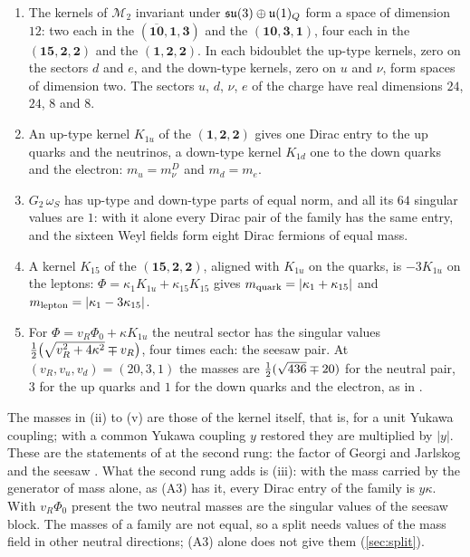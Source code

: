 \begin{theorem}
\label{thm:fermionmasses}
\begin{enumerate}[label=(\roman*),leftmargin=2.2em,itemsep=1pt]
\item The kernels of $\mathcal M_2$ invariant under $\mathfrak{su}(3)\oplus\mathfrak{u}(1)_Q$ form a space of dimension $12$: two each in the
$(\overline{\mathbf{10}},\mathbf1,\mathbf3)$ and the $(\mathbf{10},\mathbf3,\mathbf1)$, four each in the $(\mathbf{15},\mathbf2,\mathbf2)$ and the
$(\mathbf1,\mathbf2,\mathbf2)$. In each bidoublet the up-type kernels, zero on the sectors $d$ and $e$, and the down-type kernels, zero on $u$
and $\nu$, form spaces of dimension two. The sectors $u$, $d$, $\nu$, $e$ of the charge have real dimensions $24$, $24$, $8$ and $8$.
\item An up-type kernel $K_{1u}$ of the $(\mathbf1,\mathbf2,\mathbf2)$ gives one Dirac entry to the up quarks and the neutrinos, a down-type
kernel $K_{1d}$ one to the down quarks and the electron: $m_u=m_\nu^D$ and $m_d=m_e$.
\item $G_2\,\omega_S$ has up-type and down-type parts of equal norm, and all its $64$ singular values are $1$: with it alone every Dirac pair
of the family has the same entry, and the sixteen Weyl fields form eight Dirac fermions of equal mass.
\item A kernel $K_{15}$ of the $(\mathbf{15},\mathbf2,\mathbf2)$, aligned with $K_{1u}$ on the quarks, is $-3K_{1u}$ on the leptons:
$\Phi=\kappa_1K_{1u}+\kappa_{15}K_{15}$ gives $m_{\rm quark}=|\kappa_1+\kappa_{15}|$ and $m_{\rm lepton}=|\kappa_1-3\kappa_{15}|$.
\item For $\Phi=v_R\Phi_0+\kappa K_{1u}$ the neutral sector has the singular values $\tfrac12\bigl(\sqrt{v_R^2+4\kappa^2}\mp v_R\bigr)$, four
times each: the seesaw pair. At $(v_R,v_u,v_d)=(20,3,1)$ the masses are $\tfrac12(\sqrt{436}\mp20)$ for the neutral pair, $3$ for the up quarks
and $1$ for the down quarks and the electron, as in .
\end{enumerate}
\end{theorem}

The masses in (ii) to (v) are those of the kernel itself, that is, for a unit Yukawa coupling; with a common Yukawa coupling $y$ restored
they are multiplied by $|y|$. These are the statements of  at the second rung: the factor of Georgi and Jarlskog
\cite{GeorgiJarlskog79} and the seesaw \cite{Minkowski77,MohapatraSenjanovic80}. What the second rung adds is (iii): with the mass carried by
the generator of mass alone, as (A3) has it, every Dirac entry of the family is $y\kappa$. With $v_R\Phi_0$ present the two neutral masses
are the singular values of the seesaw block. The masses of a family are not equal, so a split needs values of the mass field in other
neutral directions; (A3) alone does not give them (\cref{sec:split}).

